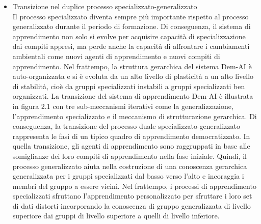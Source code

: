 \begin{itemize}
\item Transizione nel duplice processo specializzato-generalizzato\\
Il processo specializzato diventa sempre più importante rispetto al processo generalizzato durante il periodo di formazione. Di conseguenza, il sistema di apprendimento non solo si evolve per acquisire capacità di specializzazione dai compiti appresi, ma perde anche la capacità di affrontare i cambiamenti ambientali come nuovi agenti di apprendimento e nuovi compiti di apprendimento. Nel frattempo, la struttura gerarchica del sistema Dem-AI è auto-organizzata e si è evoluta da un alto livello di plasticità a un alto livello di stabilità, cioè da gruppi specializzati instabili a gruppi specializzati ben organizzati. La transizione del sistema di apprendimento Dem-AI è illustrata in figura 2.1 con tre sub-meccanismi iterativi come la generalizzazione, l'apprendimento specializzato e il meccanismo di strutturazione gerarchica. Di conseguenza, la transizione del processo duale specializzato-generalizzato rappresenta le fasi di un tipico quadro di apprendimento democratizzato. In quella transizione, gli agenti di apprendimento sono raggruppati in base alle somiglianze dei loro compiti di apprendimento nella fase iniziale. Quindi, il processo generalizzato aiuta nella costruzione di una conoscenza gerarchica generalizzata per i gruppi specializzati dal basso verso l'alto e incoraggia i membri del gruppo a essere vicini. Nel frattempo, i processi di apprendimento specializzati sfruttano l'apprendimento personalizzato per sfruttare i loro set di dati distorti incorporando la conoscenza di gruppo generalizzata di livello superiore dai gruppi di livello superiore a quelli di livello inferiore.

\end{itemize}
